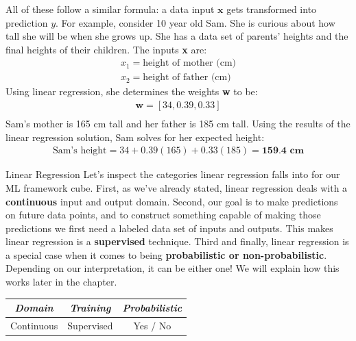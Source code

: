 
All of these follow a similar formula: a data input $\textbf{x}$ gets transformed into prediction $y$. For example, consider 10 year old Sam. She is curious about how tall she will be when she grows up. She has a data set of parents' heights and the final heights of their children. The inputs \textbf{x} are:
\begin{align*}
x_{1} = \text{height of mother (cm)} \\
x_{2} = \text{height of father (cm)}
\end{align*}
Using linear regression, she determines the weights \textbf{w} to be:
\begin{align*}
\textbf{w} = [34, 0.39, 0.33] \\
\end{align*}
Sam's mother is 165 cm tall and her father is 185 cm tall. Using the results of the linear regression solution, Sam solves for her expected height:
\begin{align*}
\text{Sam's height} = 34 + 0.39(165) + 0.33(185) = \textbf{159.4 cm}
\end{align*}

\begin{mlcube}{Linear Regression}
Let's inspect the categories linear regression falls into for our ML framework cube. First, as we've already stated, linear regression deals with a \textbf{continuous} input and output domain. Second, our goal is to make predictions on future data points, and to construct something capable of making those predictions we first need a labeled data set of inputs and outputs. This makes linear regression is a \textbf{supervised} technique. Third and finally, linear regression is a special case when it comes to being \textbf{probabilistic or non-probabilistic}. Depending on our interpretation, it can be either one! We will explain how this works later in the chapter.
\begin{center}
    \begin{tabular}{c|c|c}
    \textit{\textbf{Domain}} & \textit{\textbf{Training}} & \textit{\textbf{Probabilistic}} \\
    \hline
    Continuous & Supervised & Yes / No \\
    \end{tabular}
\end{center}
\end{mlcube}

